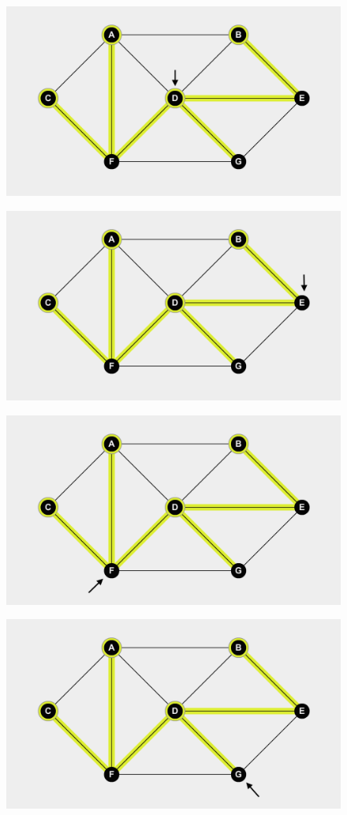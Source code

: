 \begin{homeworkProblem}
\begin{enumerate}[a)]
    \begin{figure}[ht]
\centering
\begin{minipage}{.5\textwidth}
  \centering
  \includegraphics[width=.4\linewidth]{q3-d2}
  \label{fig:test9}
\end{minipage}%
\begin{minipage}{.5\textwidth}
  \centering
  \includegraphics[width=.4\linewidth]{q3-e1}
  \label{fig:test10}
\end{minipage}
\end{figure}

    \begin{figure}[ht]
\centering
\begin{minipage}{.5\textwidth}
  \centering
  \includegraphics[width=.4\linewidth]{q3-f1}
  \label{fig:test11}
\end{minipage}%
\begin{minipage}{.5\textwidth}
  \centering
  \includegraphics[width=.4\linewidth]{q3-g1}
  \label{fig:test12}
\end{minipage}
\end{figure}


\end{enumerate}
\end{homeworkProblem}
